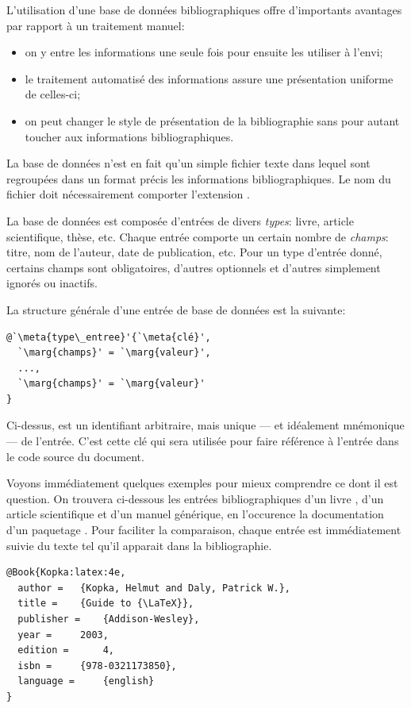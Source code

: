 L'utilisation d'une base de données bibliographiques offre
d'importants avantages par rapport à un traitement manuel:
\begin{itemize}
\item on y entre les informations une seule fois pour ensuite les
  utiliser à l'envi;
\item le traitement automatisé des informations assure une
  présentation uniforme de celles-ci;
\item on peut changer le style de présentation de la bibliographie
  sans pour autant toucher aux informations bibliographiques.
\end{itemize}

La base de données n'est en fait qu'un simple fichier texte dans
lequel sont regroupées dans un format précis les informations
bibliographiques. Le nom du fichier doit nécessairement comporter
l'extension .

La base de données est composée d'entrées de divers \emph{types}:
livre, article scientifique, thèse, etc. Chaque entrée comporte un
certain nombre de \emph{champs}: titre, nom de l'auteur, date de
publication, etc. Pour un type d'entrée donné, certains champs sont
obligatoires, d'autres optionnels et d'autres simplement ignorés ou
inactifs.

La structure générale d'une entrée de base de données est la suivante:
\begin{lstlisting}
@`\meta{type\_entree}'{`\meta{clé}',
  `\marg{champs}' = `\marg{valeur}',
  ...,
  `\marg{champs}' = `\marg{valeur}'
}
\end{lstlisting}
Ci-dessus,  est un identifiant arbitraire, mais unique ---
et idéalement mnémonique --- de l'entrée. C'est cette clé qui sera
utilisée pour faire référence à l'entrée dans le code source du
document.

Voyons immédiatement quelques exemples pour mieux comprendre ce dont
il est question. On trouvera ci-dessous les entrées bibliographiques
d'un livre \citep{Kopka:latex:4e}, d'un article scientifique
\citep{Mori:bibliographies:2009} et d'un manuel générique, en
l'occurence la documentation d'un paquetage \citep{natbib}. Pour
faciliter la comparaison, chaque entrée est immédiatement suivie du
texte tel qu'il apparait dans la bibliographie.

\begin{lstlisting}
@Book{Kopka:latex:4e,
  author = 	 {Kopka, Helmut and Daly, Patrick W.},
  title = 	 {Guide to {\LaTeX}},
  publisher = 	 {Addison-Wesley},
  year = 	 2003,
  edition = 	 4,
  isbn = 	 {978-0321173850},
  language = 	 {english}
}
\end{lstlisting}

